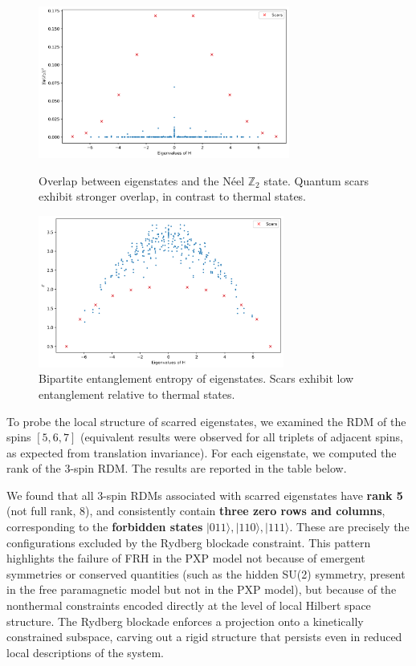 \documentclass{article}
\begin{document}
\begin{figure}[h!]
  \centering
  \begin{minipage}[c]{0.45\textwidth}
    \centering
    \includegraphics[height=5cm]{pxp_neel.png}
    \caption{Overlap between eigenstates and the Néel \( \mathbb{Z}_2 \) state. Quantum scars exhibit stronger overlap, in contrast to thermal states.}
  \end{minipage}
  \hfill
  \begin{minipage}[c]{0.45\textwidth}
    \centering
    \includegraphics[height=5cm]{pxp_entanglement.png}
    \caption{Bipartite entanglement entropy of eigenstates. Scars exhibit low entanglement relative to thermal states.}
  \end{minipage}
  \label{fig:minipage-images}
\end{figure}

To probe the local structure of scarred eigenstates, we examined the RDM of the spins \([5,6,7]\) (equivalent results were observed for all triplets of adjacent spins, as expected from translation invariance). For each eigenstate, we computed the rank of the 3-spin RDM. The results are reported in the table below.

We found that all 3-spin RDMs associated with scarred eigenstates have \textbf{rank 5} (not full rank, 8), and consistently contain \textbf{three zero rows and columns}, corresponding to the \textbf{forbidden states} \( |011\rangle, |110\rangle, |111\rangle \). These are precisely the configurations excluded by the Rydberg blockade constraint.
This pattern highlights the failure of FRH in the PXP model not because of emergent symmetries or conserved quantities (such as the hidden SU(2) symmetry, present in the free paramagnetic model but not in the PXP model), but because of the nonthermal constraints encoded directly at the level of local Hilbert space structure. The Rydberg blockade enforces a projection onto a kinetically constrained subspace, carving out a rigid structure that persists even in reduced local descriptions of the system.
\end{document}

